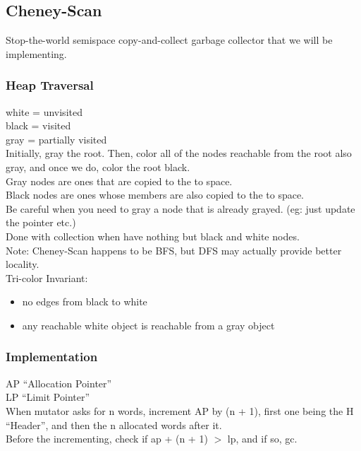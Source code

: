 \subsection{Cheney-Scan}
Stop-the-world semispace copy-and-collect garbage collector that we will be
implementing. \\

\subsubsection{Heap Traversal}
white = unvisited \\
black = visited \\
gray = partially visited \\

Initially, gray the root. Then, color all of the nodes reachable from the root
also gray, and once we do, color the root black. \\
Gray nodes are ones that are copied to the to space. \\
Black nodes are ones whose members are also copied to the to space. \\
Be careful when you need to gray a node that is already grayed. (eg: just
update the pointer etc.) \\
Done with collection when have nothing but black and white nodes. \\
Note:
Cheney-Scan happens to be BFS, but DFS may actually provide better locality. \\

Tri-color Invariant:
\begin{itemize}
  \item no edges from black to white
  \item any reachable white object is reachable from a gray object
\end{itemize}

\subsubsection{Implementation}
AP ``Allocation Pointer'' \\
LP ``Limit Pointer'' \\

When mutator asks for n words, increment AP by (n + 1), first one being the
H ``Header'', and then the n allocated words after it. \\
Before the incrementing, check if ap + (n + 1) $>$ lp, and if so, gc. \\

